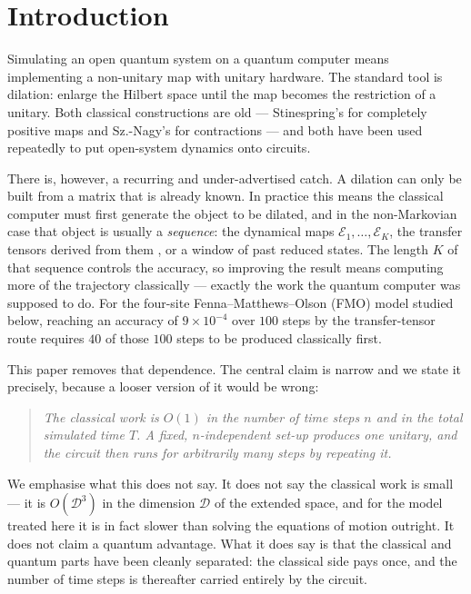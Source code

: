 \documentclass[aps,prx,twocolumn,superscriptaddress,nofootinbib,longbibliography]{revtex4-2}
\theoremstyle{plain}
\begin{document}
\section{Introduction}

Simulating an open quantum system on a quantum computer means implementing a
non-unitary map with unitary hardware.  The standard tool is dilation: enlarge
the Hilbert space until the map becomes the restriction of a unitary.  Both
classical constructions are old --- Stinespring's for completely positive maps
\cite{Stinespring1955} and Sz.-Nagy's for contractions \cite{SzNagy1953} --- and
both have been used repeatedly to put open-system dynamics onto circuits.

There is, however, a recurring and under-advertised catch.  A dilation can only
be built from a matrix that is already known.  In practice this means the
classical computer must first generate the object to be dilated, and in the
non-Markovian case that object is usually a \emph{sequence}: the dynamical maps
$\mathcal E_1,\dots,\mathcal E_K$, the transfer tensors derived from them
\cite{Cerrillo2014}, or a window of past reduced states.  The length $K$ of that
sequence controls the accuracy, so improving the result means computing more of
the trajectory classically --- exactly the work the quantum computer was
supposed to do.  For the four-site Fenna--Matthews--Olson (FMO) model studied
below, reaching an accuracy of $9\times10^{-4}$ over $100$ steps by the
transfer-tensor route requires $40$ of those $100$ steps to be produced
classically first.

This paper removes that dependence.  The central claim is narrow and we state it
precisely, because a looser version of it would be wrong:

\begin{quote}
\emph{The classical work is $O(1)$ in the number of time steps $n$ and in the
total simulated time $T$.  A fixed, $n$-independent set-up produces one unitary,
and the circuit then runs for arbitrarily many steps by repeating it.}
\end{quote}

We emphasise what this does not say.  It does not say the classical work is
small --- it is $O(\mathcal D^3)$ in the dimension $\mathcal D$ of the extended
space, and for the model treated here it is in fact slower than solving the
equations of motion outright.  It does not claim a quantum advantage.  What it
does say is that the classical and quantum parts have been cleanly separated:
the classical side pays once, and the number of time steps is thereafter carried
entirely by the circuit.
\end{document}
